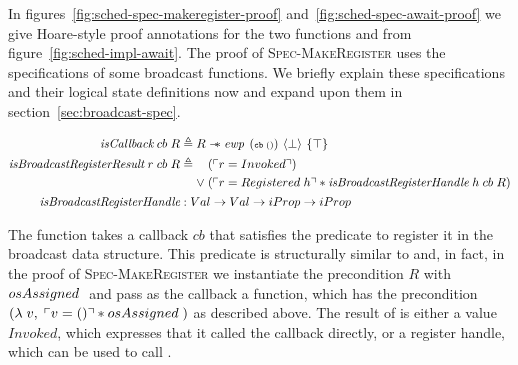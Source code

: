 In figures~\ref{fig:sched-spec-makeregister-proof} and~\ref{fig:sched-spec-await-proof} we give Hoare-style proof annotations for the two functions  and  from figure~\ref{fig:sched-impl-await}.
The proof of \textsc{Spec-MakeRegister} uses the specifications of some broadcast functions.
We briefly explain these specifications and their logical state definitions now and expand upon them in section~\ref{sec:broadcast-spec}.

\begin{align*}
  \gsIsCb{}\; cb\; R                            & \triangleq R \wand \ewp{cb\; ()}{\bot}{\top}                                                                    \\
  \emph{isBroadcastRegisterResult}\; r\; cb\; R & \triangleq \begin{aligned}[t]
                                                                      & (\ulcorner r = Invoked \urcorner)                                                           \\
                                                               \vee\; & (\ulcorner r = Registered\; h \urcorner \ast \emph{isBroadcastRegisterHandle}\; h\; cb\; R)
                                                             \end{aligned} \\
  \emph{isBroadcastRegisterHandle}              & : Val \to Val \to iProp \to iProp
\end{align*}


The function  takes a callback \(cb\) that satisfies the \gsIsCb{} predicate to register it in the broadcast data structure.
This predicate is structurally similar to \gsIsWaker{} and, in fact, in the proof of \textsc{Spec-MakeRegister} we instantiate the precondition \(R\) with \(osAssigned\;\) and pass as the callback a  function, which has the precondition \((\lambda\; v,\; \ulcorner v = () \urcorner \ast osAssigned\;)\) as described above.
The result of  is either a value \(Invoked\), which expresses that it called the callback directly, or a register handle, which can be used to call .

